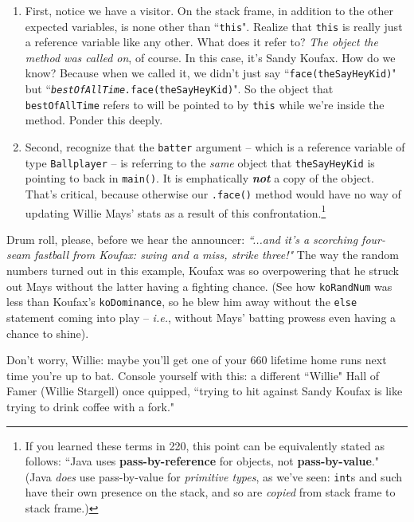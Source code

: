 \begin{enumerate}
\itemsep.1em
\item First, notice we have a visitor. On the stack frame, in addition to the
other expected variables, is none other than ``\texttt{this}". Realize that
\texttt{this} is really just a reference variable like any other. What does it
refer to? \textit{The object the method was called on}, of course. In this
case, it's Sandy Koufax. How do we know? Because when we called it, we didn't
just say ``\texttt{face(theSayHeyKid)}" but
``\texttt{\textit{bestOfAllTime.}face(theSayHeyKid)}". So the object that
\texttt{bestOfAllTime} refers to will be pointed to by \texttt{this} while
we're inside the method. Ponder this deeply.

\item Second, recognize that the \texttt{batter} argument -- which is a
reference variable of type \texttt{Ballplayer} -- is referring to the
\textit{same} object that \texttt{theSayHeyKid} is pointing to back in
\texttt{main()}. It is emphatically \textbf{\textit{not}} a copy of the
object. That's critical, because otherwise our \texttt{.face()} method would
have no way of updating Willie Mays' stats as a result of this
confrontation.\footnote{If you learned these terms in 220, this point can be
equivalently stated as follows: ``Java uses \textbf{pass-by-reference} for
objects, not \textbf{pass-by-value}." (Java \textit{does} use pass-by-value
for \textit{primitive types}, as we've seen: \texttt{int}s and such have their
own presence on the stack, and so are \textit{copied} from stack frame to
stack frame.)}

\end{enumerate}

Drum roll, please, before we hear the announcer: \textit{``...and it's a
scorching four-seam fastball from Koufax: swing and a miss, strike three!"}
The way the random numbers turned out in this example, Koufax was so
overpowering that he struck out Mays without the latter having a fighting
chance. (See how \texttt{koRandNum} was less than Koufax's
\texttt{koDominance}, so he blew him away without the \texttt{else} statement
coming into play -- \textit{i.e.}, without Mays' batting prowess even having a
chance to shine).

Don't worry, Willie: maybe you'll get one of your 660 lifetime home runs next
time you're up to bat. Console yourself with this: a different ``Willie" Hall
of Famer (Willie Stargell) once quipped, ``trying to hit against Sandy Koufax
is like trying to drink coffee with a fork."



